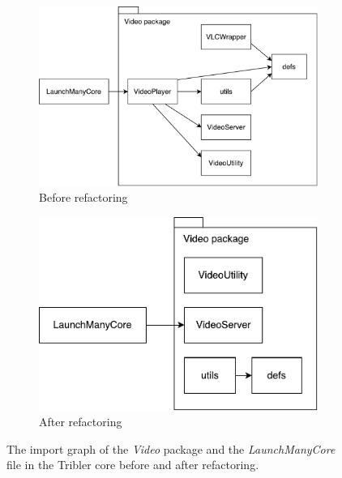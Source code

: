 \begin{figure}
	\centering
	\begin{subfigure}{.5\textwidth}
		\centering
		\includegraphics[width=.9\linewidth]{images/improving_qa/video_package_before}
		\caption{Before refactoring}
		\label{fig:video-package-refactoring-before}
	\end{subfigure}%
	\begin{subfigure}{.5\textwidth}
		\centering
		\includegraphics[width=.7\linewidth]{images/improving_qa/video_package_after}
		\caption{After refactoring}
		\label{fig:video-package-refactoring-after}
	\end{subfigure}
	\caption{The import graph of the \emph{Video} package and the \emph{LaunchManyCore} file in the Tribler core before and after refactoring.}
	\label{fig:video-package-refactoring}
\end{figure}

